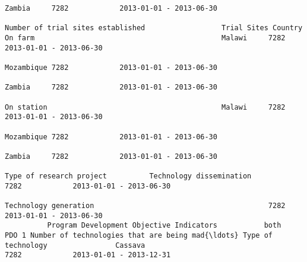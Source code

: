 \documentclass[11pt]{article}
\begin{document}
\begin{Verbatim}[commandchars=\\\{\}]
                                                                                                                                                                                                                 Zambia     7282            2013-01-01 - 2013-06-30   
                                                                         Number of trial sites established                  Trial Sites Country               On farm                                            Malawi     7282            2013-01-01 - 2013-06-30   
                                                                                                                                                                                                                 Mozambique 7282            2013-01-01 - 2013-06-30   
                                                                                                                                                                                                                 Zambia     7282            2013-01-01 - 2013-06-30   
                                                                                                                                                              On station                                         Malawi     7282            2013-01-01 - 2013-06-30   
                                                                                                                                                                                                                 Mozambique 7282            2013-01-01 - 2013-06-30   
                                                                                                                                                                                                                 Zambia     7282            2013-01-01 - 2013-06-30   
                                                                                                                            Type of research project          Technology dissemination                                      7282            2013-01-01 - 2013-06-30   
                                                                                                                                                              Technology generation                                         7282            2013-01-01 - 2013-06-30   
          Program Development Objective Indicators           both        PDO 1 Number of technologies that are being mad{\ldots} Type of technology                Cassava                                                       7282            2013-01-01 - 2013-12-31   

\end{Verbatim}
\end{document}
